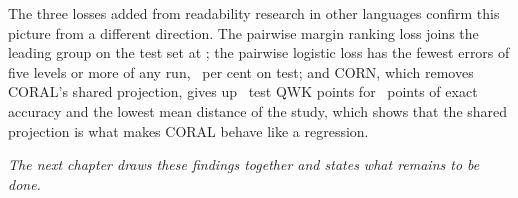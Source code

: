 The three losses added from readability research in other languages confirm this picture from
a different direction. The pairwise margin ranking loss joins the leading group on the test set
at \nlTestQwkRank; the pairwise logistic loss has the fewest errors of five levels or more of any
run, \nlTestFarFivePlr\ per cent on test; and CORN, which removes CORAL's shared projection,
gives up \nlAbsDeltaTestQwkCorn\ test QWK points for \nlAbsDeltaTestAccCorn\ points of exact
accuracy and the lowest mean distance of the study, which shows that the shared projection is what
makes CORAL behave like a regression.

\textit{The next chapter draws these findings together and states what remains to be done.}
